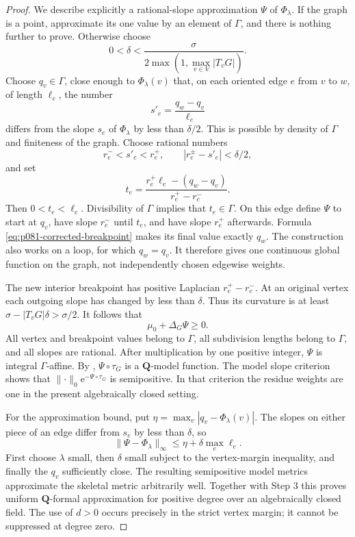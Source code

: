 \begin{proof}
We describe explicitly a rational-slope approximation $\Psi$ of
$\Phi_\lambda$.  If the graph is a point, approximate its one value by
an element of $\Gamma$, and there is nothing further to prove.
Otherwise choose
\[
 0<\delta<\frac{\sigma}{2\max(1,\max_{v\in V}|T_vG|)}.
\]
Choose $q_v\in\Gamma$, close enough to $\Phi_\lambda(v)$ that, on
each oriented edge $e$ from $v$ to $w$, of length $\ell_e$, the
number
\[
 s'_e=\frac{q_w-q_v}{\ell_e}
\]
differs from the slope $s_e$ of $\Phi_\lambda$ by less than
$\delta/2$.  This is possible by density of $\Gamma$ and finiteness
of the graph.  Choose rational numbers
\[
 r_e^-<s'_e<r_e^+,\qquad |r_e^\pm-s'_e|<\delta/2,
\]
and set
\begin{equation}
\label{eq:p081-corrected-breakpoint}
 t_e=\frac{r_e^+\ell_e-(q_w-q_v)}{r_e^+-r_e^-}.
\end{equation}
Then $0<t_e<\ell_e$.  Divisibility of $\Gamma$ implies that
$t_e\in\Gamma$.  On this edge define $\Psi$ to start at $q_v$,
have slope $r_e^-$ until $t_e$, and have slope $r_e^+$
afterwards.  Formula \eqref{eq:p081-corrected-breakpoint} makes its final
value exactly $q_w$.  The construction also works on a loop, for
which $q_w=q_v$.  It therefore gives one continuous global function
on the graph, not independently chosen edgewise weights.

The new interior breakpoint has positive Laplacian
$r_e^+-r_e^-$.  At an original vertex each outgoing slope has changed
by less than $\delta$.  Thus its curvature is at least
$\sigma-|T_vG|\delta>\sigma/2$.
It follows that
\[
                         \mu_0+\Delta_G\Psi\geq0.
\]
All vertex and breakpoint values belong to $\Gamma$, all subdivision
lengths belong to $\Gamma$, and all slopes are rational.  After
multiplication by one positive integer, $\Psi$ is integral
$\Gamma$-affine.  By \cite[Proposition~3.5(c)]{GJKM19},
$\Psi\circ\tau_G$ is a $\mathbf Q$-model function.  The model slope
criterion \cite[Proposition~3.7]{GJKM19} shows that
$\lVert\cdot\rVert_0\mathrm e^{-\Psi\circ\tau_G}$ is semipositive.
In that criterion the residue weights are one in the present
algebraically closed setting.

For the approximation bound, put
$\eta=\max_v|q_v-\Phi_\lambda(v)|$.  The slopes on either piece of
an edge differ from $s_e$ by less than $\delta$, so
\[
 \lVert\Psi-\Phi_\lambda\rVert_\infty
       \leq\eta+\delta\max_e\ell_e.
\]
First choose $\lambda$ small, then $\delta$ small subject to the
vertex-margin inequality, and finally the $q_v$ sufficiently close.
The resulting semipositive model metrics approximate the skeletal
metric arbitrarily well.  Together with Step 3 this proves uniform
$\mathbf Q$-formal approximation for positive degree over an
algebraically closed field.  The use of $d>0$ occurs precisely in the
strict vertex margin; it cannot be suppressed at degree zero.


\end{proof}
